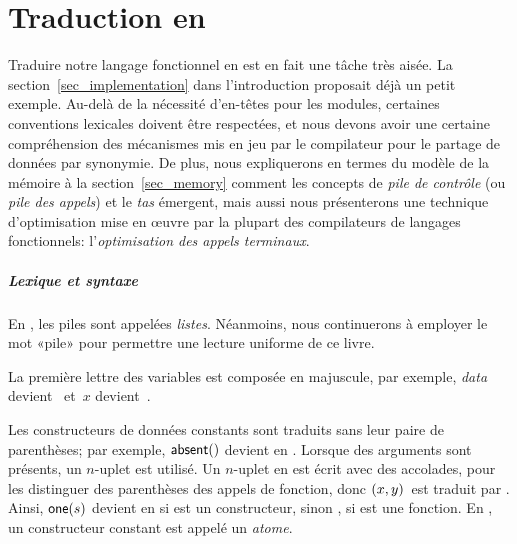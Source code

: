 \chapter{Traduction en \Erlang}

Traduire notre langage fonctionnel en \Erlang est en fait une tâche
très aisée. La section~\ref{sec_implementation} dans l'introduction
proposait déjà un petit exemple. Au-delà de la nécessité d'en-têtes
pour les modules, certaines conventions lexicales doivent être
respectées, et nous devons avoir une certaine compréhension des
mécanismes mis en jeu par le compilateur pour le partage de données
par synonymie. De plus, nous expliquerons en termes du modèle de la
mémoire à la section~\ref{sec_memory} comment les concepts de
\emph{pile de contrôle} (ou \emph{pile des appels}) et le \emph{tas}
émergent, mais aussi nous présenterons une technique d'optimisation
mise en {\oe}uvre par la plupart des compilateurs de langages
fonctionnels: l'\emph{optimisation des appels
  terminaux}.

\paragraph{Lexique et syntaxe}

En \Erlang, les piles sont appelées \emph{listes}. Néanmoins, nous
continuerons à employer le mot «pile» pour permettre une lecture
uniforme de ce livre.

La première lettre des variables est composée en majuscule, par
exem\-ple, \emph{data} devient~ et~\(x\)
devient~.

Les constructeurs de données constants sont traduits sans leur paire de parenthèses; par
exemple, \(\textsf{absent}()\) devient  en
\Erlang. Lorsque des arguments sont présents, un \(n\)-uplet est
utilisé. Un \(n\)-uplet en \Erlang est écrit avec des accolades, pour
les distinguer des parenthèses des appels de fonction, donc
\(({x},{y})\)~est traduit par . Ainsi,
\(\textsf{one}(s)\) devient  en \Erlang si 
est un constructeur, sinon , si  est
une fonction. En \Erlang, un constructeur constant est appelé un
\emph{atome}.


